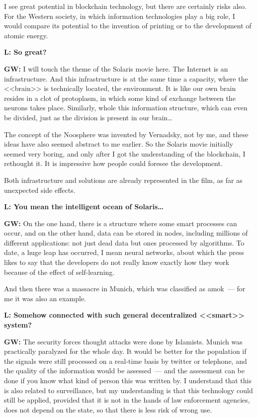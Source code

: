 \documentclass[10pt, a5paper]{article}
\begin{document}
\begin{Parallel}[p]{}{}
{I see great potential in blockchain technology, but there are certainly risks also. For the Western society, in which information technologies play a big role, I would compare its potential to the invention of printing or to the development of atomic energy.

{\noindent \bf L:  So great?}

{\noindent \bf GW:} I will touch the theme of the Solaris movie here. The Internet is an infrastructure. And this infrastructure is at the same time a capacity, where the <<brain>> is technically located, the environment. It is like our own brain resides in a clot of protoplasm, in which some kind of exchange between the neurons takes place. Similarly, whole this information structure, which can even be divided, just as the division is present in our brain\ldots

The concept of the Noosphere was invented by Vernadsky, not by me, and these ideas have also seemed abstract to me earlier. So the Solaris movie initially seemed very boring, and only after I got the understanding of the blockchain, I rethought it. It is impressive how people could foresee the development.

Both infrastructure and solutions are already represented in the film, as far as unexpected side effects.


{\noindent \bf L: You mean the intelligent ocean of Solaris\ldots }

{\noindent \bf GW:}  On the one hand, there is a structure where some smart processes can occur, and on the other hand, data can be stored in nodes, including millions of different applications: not just dead data but ones processed by algorithms. To date, a huge leap has occurred, I mean neural networks, about which the press likes to say that the developers do not really know exactly how they work because of the effect of self-learning.

And then there was a massacre in Munich, which was classified as amok~--- for me it was also an example.

{\noindent \bf L: Somehow connected with such general decentralized <<smart>> system? }

{\noindent \bf GW:}  The security forces thought attacks were done by Islamists. Munich was practically paralyzed for the whole day. It would be better for the population if the signals were still processed on a real-time basis by twitter or telephone, and the quality of the information would be assessed~--- and the assessment can be done if you know what kind of person this was written by. I understand that this is also related to surveillance, but my understanding is that this technology could still be applied, provided that it is not in the hands of law enforcement agencies, does not depend on the state, so that there is less risk of wrong use.



}
\end{Parallel}
\end{document}
